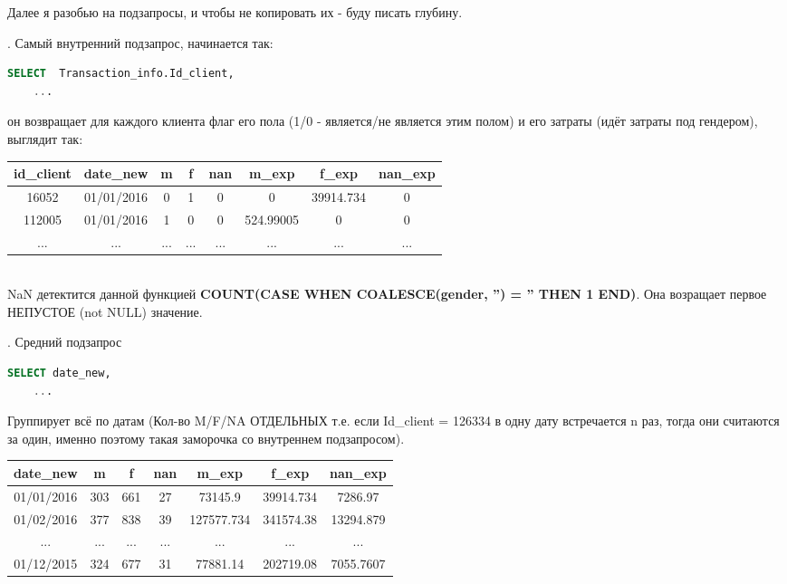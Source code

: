 \documentclass[12pt, a3paper]{article}
\begin{document}
\noindent
Далее я разобью на подзапросы, и чтобы не копировать их - буду писать глубину.

. Самый внутренний подзапрос, начинается так:
\begin{lstlisting}[language=SQL]
    SELECT  Transaction_info.Id_client,
    ...
\end{lstlisting}
он возвращает для каждого клиента флаг его пола (1/0 - является/не является этим полом)
и его затраты (идёт затраты под гендером), выглядит так:
\begin{table}[h]
    \begin{tabular}{|c|c|c|c|c|c|c|c|}
        \hline
        id\_client & date\_new  & m   & f   & nan & m\_exp    & f\_exp    & nan\_exp \\ \hline
        16052      & 01/01/2016 & 0   & 1   & 0   & 0         & 39914.734 & 0        \\ \hline
        112005     & 01/01/2016 & 1   & 0   & 0   & 524.99005 & 0         & 0        \\ \hline
        ...        & ...        & ... & ... & ... & ...       & ...       & ...      \\ \hline
    \end{tabular}
\end{table}\\
NaN детектится данной функцией \textbf{COUNT(CASE WHEN COALESCE(gender, '') = '' THEN 1 END)}.
Она возращает первое НЕПУСТОЕ (not NULL) значение.

. Средний подзапрос
\begin{lstlisting}[language=SQL]
    SELECT date_new,
    ...
\end{lstlisting}
Группирует всё по датам (Кол-во M/F/NA ОТДЕЛЬНЫХ т.е. если Id\_client = 126334 в одну дату встречается
n раз, тогда они считаются за один, именно поэтому такая заморочка со внутреннем подзапросом).

\begin{table}[!h]
    \begin{tabular}{|c|c|c|c|c|c|c|}
    \hline
    date\_new  & m   & f   & nan & m\_exp     & f\_exp    & nan\_exp  \\ \hline
    01/01/2016 & 303 & 661 & 27  & 73145.9    & 39914.734 & 7286.97   \\ \hline
    01/02/2016 & 377 & 838 & 39  & 127577.734 & 341574.38 & 13294.879 \\ \hline
    ...        & ... & ... & ... & ...        & ...       & ...       \\ \hline
    01/12/2015 & 324 & 677 & 31  & 77881.14   & 202719.08 & 7055.7607 \\ \hline
    \end{tabular}
\end{table}
\end{document}
